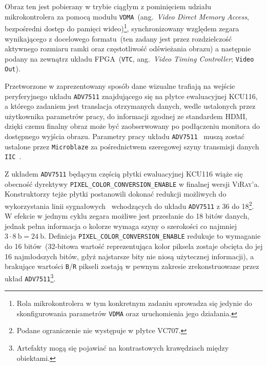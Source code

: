 Obraz ten jest pobierany w trybie ciągłym z pominięciem udziału mikrokontrolera za pomocą modułu \texttt{VDMA}~(ang.~\textit{Video Direct Memory Access}, bezpośredni dostęp do pamięci wideo)\footnote{Rola mikrokontrolera w tym konkretnym zadaniu sprowadza się jedynie do skonfigurowania parametrów \texttt{VDMA} oraz uruchomienia jego działania.}, synchronizowany względem zegara wynikającego z docelowego formatu~(ten zadany jest przez rozdzielczość aktywnego rozmiaru ramki oraz częstotliwość odświeżania obrazu) a następnie podany na zewnątrz układu FPGA~(\texttt{VTC}, ang.~\textit{Video Timing Controller}; \texttt{Video Out}).

Przetworzone w zaprezentowany sposób dane wizualne trafiają na wejście peryferyjnego układu \texttt{ADV7511} znajdującego się na płytce ewaluacyjnej KCU116, a którego zadaniem jest translacja otrzymanych danych, wedle ustalonych przez użytkownika parametrów pracy, do informacji zgodnej ze standardem HDMI, dzięki czemu finalny obraz może być zaobserwowany po podłączeniu monitora do dostępnego wyjścia obrazu. Parametry pracy układu \texttt{ADV7511}~\cite{ADV7511} muszą zostać ustalone przez \texttt{Microblaze} za pośrednictwem szeregowej szyny transmisji danych \texttt{IIC}~\cite{IIC}.

Z układem \texttt{ADV7511} będącym częścią płytki ewaluacyjnej KCU116 wiąże się obecność dyrektywy \texttt{PIXEL\_COLOR\_CONVERSION\_ENABLE} w finalnej wersji \textsc{ViRay}'a. Konstruktorzy tejże płytki postanowili dokonać redukcji możliwych do wykorzystania linii sygnałowych~\cite{KCU116_UG} wchodzących do układu \texttt{ADV7511} z 36 do 18\footnote{Podane ograniczenie nie występuje w płytce VC707.}. W efekcie w jednym cyklu zegara możliwe jest przesłanie do 18 bitów danych, jednak pełna informacja o kolorze wymaga szyny o szerokości co najmniej $3\cdot 8~\mathrm{b}=24~\mathrm{b}$. Definicja \texttt{PIXEL\_COLOR\_CONVERSION\_ENABLE} redukuje to wymaganie do 16 bitów~(32-bitowa wartość reprezentująca kolor piksela zostaje obcięta do jej 16 najmłodszych bitów, gdyż najstarsze bity nie niosą użytecznej informacji), a brakujące wartości \texttt{B}/\texttt{R} pikseli zostają w pewnym zakresie zrekonstruowane przez układ \texttt{ADV7511}\footnote{Artefakty mogą się pojawiać na kontrastowych krawędziach między obiektami.}.


\begin{landscape}
\end{landscape}

